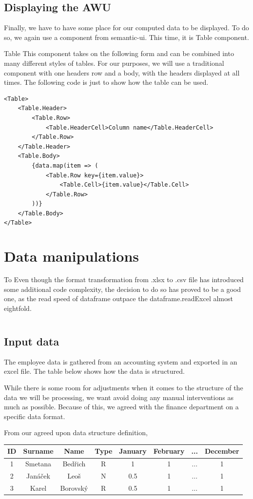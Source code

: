 \documentclass[12pt,oneside]{fithesis2}
\begin{document}
\subsection{Displaying the AWU}
Finally, we have to have some place for our computed data to be displayed. To do so, we again use a component from semantic-ui. This time, it is Table component.

Table This component takes on the following form and can be combined into many different styles of tables. For our purposes, we will use a traditional component with one headers row and a body, with the headers displayed at all times. The following code is just to show how the table can be used.

\begin{lstlisting}[style=htmlcssjs]
<Table>
	<Table.Header>
		<Table.Row>
			<Table.HeaderCell>Column name</Table.HeaderCell>
		</Table.Row>
	</Table.Header>
	<Table.Body>
		{data.map(item => (
			<Table.Row key={item.value}>
				<Table.Cell>{item.value}</Table.Cell>
			</Table.Row>
		))}
	</Table.Body>
</Table>
\end{lstlisting}



\section{Data manipulations}
To 
Even though the format transformation from .xlsx to .csv file has introduced some additional code complexity, the decision to do so has proved to be a good one, as the read speed of dataframe outpace the dataframe.readExcel almost eightfold. \cite{csv-read-speed}

\begin{lstlisting}

\end{lstlisting}

\subsection{Input data}
The employee data is gathered from an accounting system and exported in an excel file. The table below shows how the data is structured.

While there is some room for adjustments when it comes to the structure of the data we will be processing, we want avoid doing any manual interventions as much as possible. Because of this, we agreed with the finance department on a specific data format.

From our agreed upon data structure definition, 
\begin{center}
\begin{tabular}{ |c|c|c|c|c|c|c|c| } 
\hline
ID & Surname & Name & Type & January & February & ... & December \\
\hline
1 & Smetana & Bedřich & R & 1 & 1 & ... & 1\\ 
2 & Janáček & Leoš & N & 0.5 & 1 & ... & 1\\ 
3 & Karel & Borovský & R & 0.5 & 1 & ... & 1\\ 
\hline
\end{tabular}
\end{center}
\end{document}
